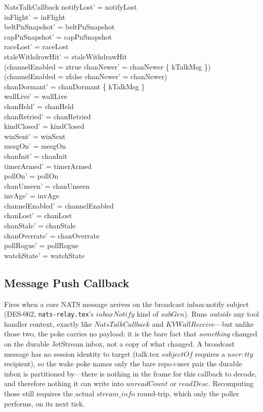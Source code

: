 \documentclass[a4paper,10pt,fleqn]{article}
\begin{document}
\begin{schema}{NatsTalkCallback}
  notifyLost' = notifyLost \\
  inFlight' = inFlight \\
  beltPnSnapshot' = beltPnSnapshot \\
  capPnSnapshot' = capPnSnapshot \\
  raceLost' = raceLost \\
  staleWithdrawHit' = staleWithdrawHit \\
  (channelEnabled = ztrue \implies
  chanNewer' = chanNewer \cup \{ kTalkMsg \}) \\
  (channelEnabled = zfalse \implies chanNewer' = chanNewer) \\
  chanDormant' = chanDormant \setminus \{ kTalkMsg \} \\
  wallLive' = wallLive \\
  chanHeld' = chanHeld \\
  chanRetried' = chanRetried \\
  kindClosed' = kindClosed \\
  winSent' = winSent \\
  mesgOn' = mesgOn \\
  chanInit' = chanInit \\
  timerArmed' = timerArmed \\
  pollOn' = pollOn \\
  chanUnseen' = chanUnseen \\
  invAge' = invAge \\
  channelEnabled' = channelEnabled \\
  chanLost' = chanLost \\
  chanStale' = chanStale \\
  chanOverrate' = chanOverrate \\
  pollRogue' = pollRogue \\
  watchState' = watchState
\end{schema}

\subsection{Message Push Callback}

Fires when a core NATS message arrives on the broadcast inbox-notify
subject (DES-062, \texttt{nats-relay.tex}'s $inboxNotify$ kind of $subGen$).
Runs \emph{outside} any tool handler context, exactly like
$NatsTalkCallback$ and $KVWallReceive$---but unlike those two, the poke
carries no payload: it is the bare fact that \emph{something} changed on
the durable JetStream inbox, not a copy of what changed.  A broadcast
message has no session identity to target (talk.tex $subjectOf$ requires
a $user:tty$ recipient), so the wake poke names only the bare repo+user
pair the durable inbox is partitioned by---there is nothing in the frame
for this callback to decode, and therefore nothing it can write into
$unreadCount$ or $readDesc$.  Recomputing those still requires the actual
$stream\_info$ round-trip, which only the poller performs, on its next
tick.
\end{document}
